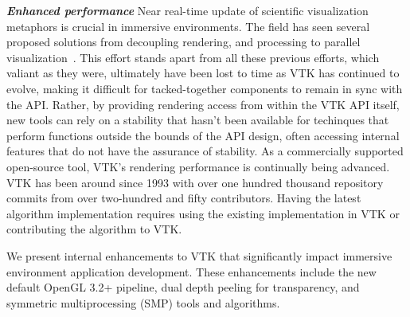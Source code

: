 
\textit{\textbf{Enhanced performance}} Near real-time update of scientific visualization metaphors is crucial in immersive environments.
The field has seen several proposed solutions from decoupling rendering, and processing to parallel visualization~\cite{Bryson:1996, vanReimersdahl:2000}.
This effort stands apart from all these previous efforts, which valiant
as they were, ultimately have been lost to time as VTK has continued to
evolve, making it difficult for tacked-together components to remain in
sync with the API.
Rather, by providing rendering access from within the VTK API itself, new
tools can rely on a stability that hasn't been available for techinques
that perform functions outside the bounds of the API design, often accessing
internal features that do not have the assurance of stability.
As a commercially supported open-source tool, VTK's rendering performance is
continually being advanced.
VTK has been around since 1993 with over one hundred thousand repository commits from over two-hundred and fifty contributors.
Having the latest algorithm implementation requires using the existing implementation in VTK or contributing the algorithm to VTK.

We present internal enhancements to VTK that significantly impact immersive
environment application development.
These enhancements include the new default OpenGL 3.2+ pipeline,
dual depth peeling for transparency, and symmetric multiprocessing (SMP)
tools and algorithms.


